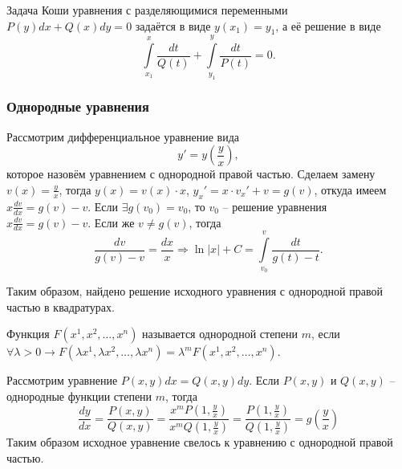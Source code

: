     \begin{proposition}
        Задача Коши уравнения с разделяющимися переменными $P(y)dx + Q(x)dy = 0$ задаётся в виде $y(x_1) = y_1$, а её решение в виде 
        \begin{equation}
            \int\limits_{x_1}^{x} \frac{dt}{Q(t)} + \int\limits_{y_1}^{y} \frac{dt}{P(t)} = 0.
        \end{equation}
    \end{proposition}

    \subsubsection{Однородные уравнения}

    Рассмотрим дифференциальное уравнение вида
    \[ y' = y \left( \frac{y}{x} \right), \]
    которое назовём уравнением с однородной правой частью. Сделаем замену $v(x) = \frac{y}{x}$, тогда $y(x) = v(x) \cdot x$, $y_x' = x \cdot v_x' + v = g(v)$, откуда имеем $x \frac{dv}{dx} = g(v) - v$. Если $\exists g(v_0) = v_0$, то $v_0$ -- решение уравнения $x \frac{dv}{dx} = g(v) - v$. Если же $v \neq g(v)$, тогда
    \begin{equation}
        \frac{dv}{g(v) - v} = \frac{dx}{x} \Rightarrow \ln |x| + C = \int\limits_{v_0}^{v} \frac{dt}{g(t) - t}.
    \end{equation}

    Таким образом, найдено решение исходного уравнения с однородной правой частью в квадратурах.

    \begin{definition}
        Функция $F(x^1, x^2, \dots, x^n)$ называется однородной степени $m$, если $\forall \lambda > 0 \longrightarrow F(\lambda x^1, \lambda x^2, \dots,  \lambda x^n) = \lambda^m F(x^1, x^2, \dots, x^n)$.
    \end{definition}

    \begin{example}
        Рассмотрим уравнение $P(x, y) dx = Q(x, y) dy$. Если $P(x, y)$ и $Q(x, y)$ -- однородные функции степени $m$, тогда
        \begin{equation}
            \frac{dy}{dx} = \frac{P(x, y)}{Q(x, y)} = \frac{x^m P(1, \frac{y}{x})}{x^m Q(1, \frac{y}{x})} = \frac{P(1, \frac{y}{x})}{Q(1, \frac{y}{x})} = g \left( \frac{y}{x} \right)
        \end{equation}
        Таким образом исходное уравнение свелось к уравнению с однородной правой частью.
    \end{example}

